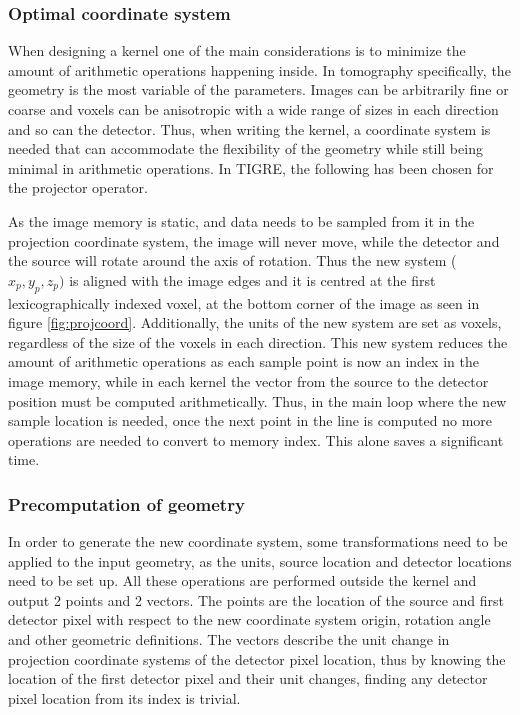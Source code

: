 \subsubsection{Optimal coordinate system}

When designing a kernel one of the main considerations is to minimize the amount of arithmetic operations happening inside. In tomography specifically, the geometry is the most variable of the parameters. Images can be arbitrarily fine or coarse and voxels can be anisotropic with a wide range of sizes in each direction and so can the detector. Thus, when writing the kernel, a coordinate system is needed that can accommodate the flexibility of the geometry while still being minimal in arithmetic operations. In TIGRE, the following has been chosen for the projector operator.

As the image memory is static, and data needs to be sampled from it in the projection coordinate system, the image will never move, while the detector and the source will rotate around the axis of rotation. Thus the new system ($x_p,y_p,z_p)$ is aligned with the image edges and it is centred at the first lexicographically indexed voxel, at the bottom corner of the image as seen in figure \ref{fig:projcoord}.  Additionally, the units of the new system are set as voxels, regardless of the size of the voxels in each direction. This new system reduces the amount of arithmetic operations as each sample point is now an index in the image memory, while in each kernel the vector from the source to the detector position must be computed arithmetically. Thus, in the main loop where the new sample location is needed, once the next point in the line is computed no more operations are needed to convert to memory index. This alone saves a significant time.


\subsubsection{Precomputation of geometry}

In order to generate the new coordinate system, some transformations need to be applied to the input geometry, as the units, source location and detector locations need to be set up. All these operations are performed outside the kernel and output 2 points and 2 vectors. The points are the location of the source and first detector pixel with respect to the new coordinate system origin, rotation angle and other geometric definitions. The vectors describe the unit change in projection coordinate systems of the detector pixel location, thus by knowing the location of the first detector pixel and their unit changes, finding any detector pixel location from its index is trivial.

